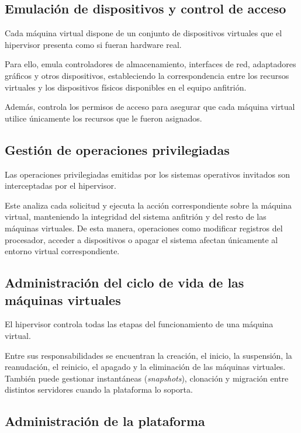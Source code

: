 \subsection{Emulación de dispositivos y control de acceso}

Cada máquina virtual dispone de un conjunto de dispositivos virtuales que el hipervisor presenta como si fueran hardware real.

Para ello, emula controladores de almacenamiento, interfaces de red, adaptadores gráficos y otros dispositivos, estableciendo la correspondencia entre los recursos virtuales y los dispositivos físicos disponibles en el equipo anfitrión.

Además, controla los permisos de acceso para asegurar que cada máquina virtual utilice únicamente los recursos que le fueron asignados.

\subsection{Gestión de operaciones privilegiadas}

Las operaciones privilegiadas emitidas por los sistemas operativos invitados son interceptadas por el hipervisor.

Este analiza cada solicitud y ejecuta la acción correspondiente sobre la máquina virtual, manteniendo la integridad del sistema anfitrión y del resto de las máquinas virtuales. De esta manera, operaciones como modificar registros del procesador, acceder a dispositivos o apagar el sistema afectan únicamente al entorno virtual correspondiente.

\subsection{Administración del ciclo de vida de las máquinas virtuales}

El hipervisor controla todas las etapas del funcionamiento de una máquina virtual.

Entre sus responsabilidades se encuentran la creación, el inicio, la suspensión, la reanudación, el reinicio, el apagado y la eliminación de las máquinas virtuales. También puede gestionar instantáneas (\textit{snapshots}), clonación y migración entre distintos servidores cuando la plataforma lo soporta.

\subsection{Administración de la plataforma}

